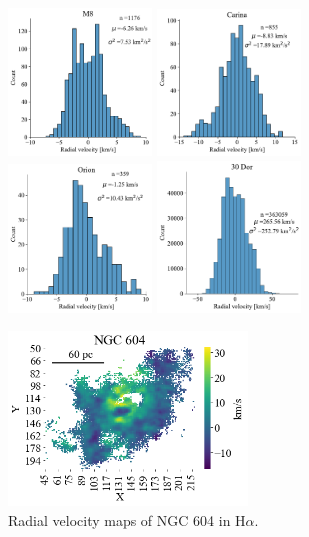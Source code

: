 \documentclass[fleqn,usenatbib, useAMS, a4paper]{mnras}
\begin{document}
\begin{figure}
\begin{multicols}{4}
\includegraphics[width=1.5in]{Figures/Hist/M8.pdf}\par
\includegraphics[width=1.5in]{Figures/Hist/Car.pdf}\par
\includegraphics[width=1.5in]{Figures/Hist/Orion.pdf}\par
\includegraphics[width=1.5in]{Figures/Hist/30Dor.pdf}\par
\end{multicols}
\caption{}
\label{fig:hist}
\end{figure}



\begin{figure}
\centering 
\includegraphics[width=2.5in]{Figures/M6T}
\caption{Radial velocity maps of NGC 604 in H$\alpha$.  }
\label{fig:M604}
\end{figure}
\end{document}
